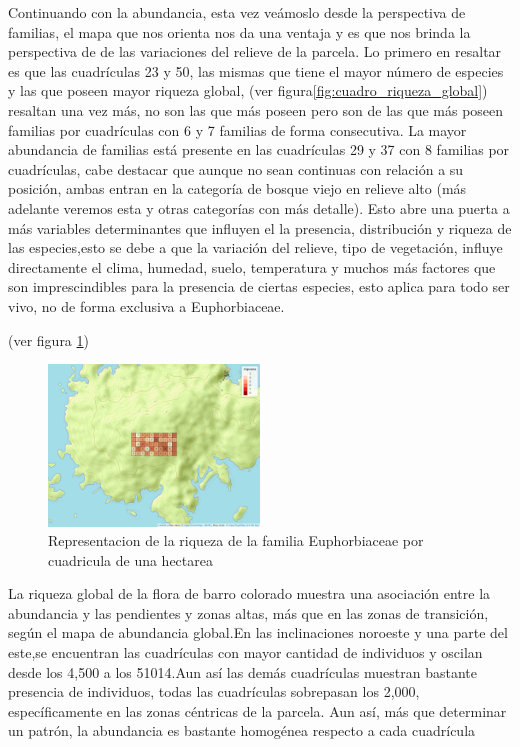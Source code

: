 \documentclass[11pt,]{article}
\begin{document}
Continuando con la abundancia, esta vez veámoslo desde la perspectiva de
familias, el mapa que nos orienta nos da una ventaja y es que nos brinda
la perspectiva de de las variaciones del relieve de la parcela. Lo
primero en resaltar es que las cuadrículas 23 y 50, las mismas que tiene
el mayor número de especies y las que poseen mayor riqueza global, (ver
figura\ref{fig:cuadro_riqueza_global}) resaltan una vez más, no son las
que más poseen pero son de las que más poseen familias por cuadrículas
con 6 y 7 familias de forma consecutiva. La mayor abundancia de familias
está presente en las cuadrículas 29 y 37 con 8 familias por cuadrículas,
cabe destacar que aunque no sean continuas con relación a su posición,
ambas entran en la categoría de bosque viejo en relieve alto (más
adelante veremos esta y otras categorías con más detalle). Esto abre una
puerta a más variables determinantes que influyen el la presencia,
distribución y riqueza de las especies,esto se debe a que la variación
del relieve, tipo de vegetación, influye directamente el clima, humedad,
suelo, temperatura y muchos más factores que son imprescindibles para la
presencia de ciertas especies, esto aplica para todo ser vivo, no de
forma exclusiva a Euphorbiaceae.

(ver figura \ref{fig:cuadro_de_riqueza_familia})

\begin{figure}
\centering
\includegraphics[width=0.50000\textwidth]{mapa_cuadros_riq_mi_familia.png}
\caption{\label{fig:cuadro_de_riqueza_familia}Representacion de la
riqueza de la familia Euphorbiaceae por cuadricula de una hectarea}
\end{figure}

La riqueza global de la flora de barro colorado muestra una asociación
entre la abundancia y las pendientes y zonas altas, más que en las zonas
de transición, según el mapa de abundancia global.En las inclinaciones
noroeste y una parte del este,se encuentran las cuadrículas con mayor
cantidad de individuos y oscilan desde los 4,500 a los 51014.Aun así las
demás cuadrículas muestran bastante presencia de individuos, todas las
cuadrículas sobrepasan los 2,000, específicamente en las zonas céntricas
de la parcela. Aun así, más que determinar un patrón, la abundancia es
bastante homogénea respecto a cada cuadrícula
\end{document}
